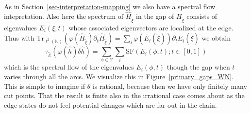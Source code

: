\documentclass[11pt]{amsart}
\newcommand{\N}{\mathbb{N}}
\begin{document}
As in Section~\ref{sec-interpretation-mapping} we also have a spectral flow intepretation. Also here the spectrum of $\hat H_{\tilde\xi}$ in the gap of 
$H_{\tilde\xi}$ consists of eigenvalues $E_i(\xi,t)$ whose associated eigenvectors are localized at the edge. Thus with 
$\mathrm{Tr}_{\ell^2(\N)}(\varphi(\hat H_{\tilde\xi})\partial_t \hat H_{\tilde\xi} ) = \sum_i \varphi(E_i({\tilde\xi}))\partial_t E_i({\tilde\xi})$ 
we obtain
\begin{equation}\label{eq-SF-edge}
\tau_{\tilde{\mathcal  E}}(\varphi(\hat h)\delta \hat h)   = \sum_{\phi\in{\mathcal C}} \sum_i\mathrm{SF}(E_i(\phi,t);t\in [0,1])
\end{equation}
which is the spectral flow of the eigenvalues $E_i(\phi,t)$ though the gap when $t$ varies through all the arcs. 
We visualize this in Figure~\ref{primary_gaps_WN}. This is simple to imagine if $\theta$ is rational, because then we have only finitely many cut points. That the result is finite also in the irrational case comes about as the edge states do not feel potential changes which are far out in the chain. 
\end{document}

